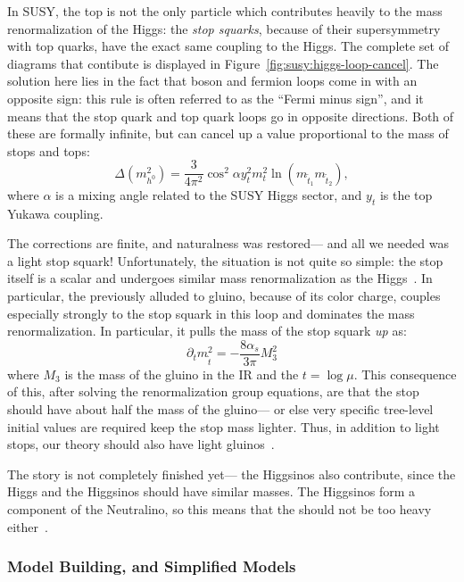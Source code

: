 In SUSY, the top is not the only particle which contributes heavily to the mass renormalization of the Higgs: the \textit{stop squarks}, because of their supersymmetry with top quarks, have the exact same coupling to the Higgs. The complete set of diagrams that contibute is displayed in Figure~\ref{fig:susy:higgs-loop-cancel}. The solution here lies in the fact that boson and fermion loops come in with an opposite sign: this rule is often referred to as the ``Fermi minus sign'', and it means that the stop quark and top quark loops go in opposite directions. Both of these are formally infinite, but can cancel up a value proportional to the mass of stops and tops: \cite{Martin1997}
%
\begin{equation}
\Delta(m_{h^0}^2) = \frac{3}{4\pi^2} \cos^2 \alpha y_t^2 m_t^2 \ln \left( m_{\tilde{t}_1} m_{\tilde{t}_2} \right),
\end{equation}
%
where $\alpha$ is a mixing angle related to the SUSY Higgs sector, and $y_t$ is the top Yukawa coupling.

The corrections are finite, and naturalness was restored--- and all we needed was a light stop squark! Unfortunately, the situation is not quite so simple: the stop itself is a scalar and undergoes similar mass renormalization as the Higgs~\cite{natural}. In particular, the previously alluded to gluino, because of its color charge, couples especially strongly to the stop squark in this loop and dominates the mass renormalization. In particular, it pulls the mass of the stop squark \textit{up} as:~\cite{natural}
%
\begin{equation}
\partial_t m_{\tilde{t}}^2 = - \frac{8\alpha_s}{3\pi} M_3^2
\end{equation}
%
where $M_3$ is the mass of the gluino in the IR and the $t = \log \mu$. This consequence of this, after solving the renormalization group equations, are that the stop should have about half the mass of the gluino--- or else very specific tree-level initial values are required keep the stop mass lighter. Thus, in addition to light stops, our theory should also have light gluinos~\cite{natural}.

The story is not completely finished yet--- the Higgsinos also contribute, since the Higgs and the Higgsinos should have similar masses. The Higgsinos form a component of the Neutralino, so this means that the \lsp should not be too heavy either~\cite{natural}.


\subsubsection{Model Building, and Simplified Models}

